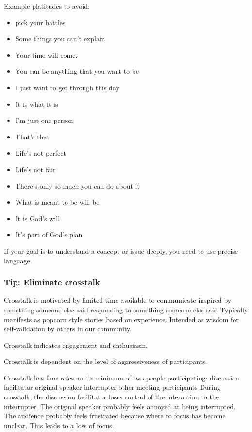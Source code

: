 Example platitudes to avoid:
\begin{itemize}
    \item pick your battles
    \item Some things you can't explain
    \item Your time will come.
    \item You can be anything that you want to be
    \item I just want to get through this day
    \item It is what it is
    \item I'm just one person
    \item That's that
    \item Life's not perfect
    \item Life's not fair
    \item There's only so much you can do about it
    \item What is meant to be will be
    \item It is God's will
    \item It's part of God's plan
\end{itemize}

If your goal is to understand a concept or issue deeply, you need to use precise language.


\subsubsection{Tip: Eliminate crosstalk}

Crosstalk is motivated by
limited time available to communicate
inspired by something someone else said
responding to something someone else said
Typically manifests as popcorn style stories based on experience. Intended as wisdom for self-validation by others in our community. 

Crosstalk indicates engagement and enthusiasm. 

Crosstalk is dependent on the level of aggressiveness of participants.

Crosstalk has four roles and a minimum of two people participating:
discussion facilitator
original speaker
interrupter
other meeting participants
During crosstalk, the discussion facilitator loses control of the interaction to the interrupter. The original speaker probably feels annoyed at being interrupted. The audience probably feels frustrated because where to focus has become unclear. This leads to a loss of focus. 

